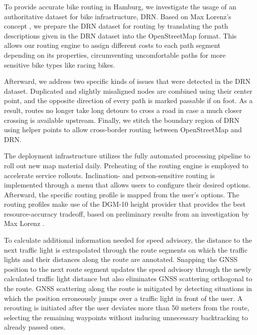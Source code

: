 \begin{Summary}
To provide accurate bike routing in Hamburg, we investigate the usage of an authoritative dataset for bike infrastructure, DRN. Based on Max Lorenz's concept \cite{lorenz_2022}, we prepare the DRN dataset for routing by translating the path descriptions given in the DRN dataset into the OpenStreetMap format. This allows our routing engine to assign different costs to each path segment depending on its properties, circumventing uncomfortable paths for more sensitive bike types like racing bikes. 

Afterward, we address two specific kinds of issues that were detected in the DRN dataset. Duplicated and slightly misaligned nodes are combined using their center point, and the opposite direction of every path is marked passable if on foot. As a result, routes no longer take long detours to cross a road in case a much closer crossing is available upstream. Finally, we stitch the boundary region of DRN using helper points to allow cross-border routing between OpenStreetMap and DRN. 

The deployment infrastructure utilizes the fully automated processing pipeline to roll out new map material daily. Preheating of the routing engine is employed to accelerate service rollouts. Inclination- and person-sensitive routing is implemented through a menu that allows users to configure their desired options. Afterward, the specific routing profile is mapped from the user's options. The routing profiles make use of the DGM-10 height provider that provides the best resource-accuracy tradeoff, based on preliminary results from an investigation by Max Lorenz \cite{lorenz_2022}. 

To calculate additional information needed for speed advisory, the distance to the next traffic light is extrapolated through the route segments on which the traffic lights and their distances along the route are annotated. Snapping the GNSS position to the next route segment updates the speed advisory through the newly calculated traffic light distance but also eliminates GNSS scattering orthogonal to the route. GNSS scattering along the route is mitigated by detecting situations in which the position erroneously jumps over a traffic light in front of the user. A rerouting is initiated after the user deviates more than 50 meters from the route, selecting the remaining waypoints without inducing unnecessary backtracking to already passed ones. 
\end{Summary}

